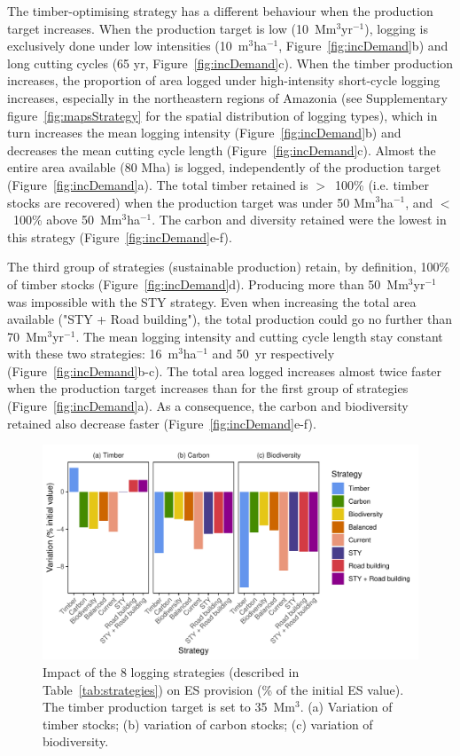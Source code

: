 \documentclass{article}
\begin{document}
The timber-optimising strategy has a different behaviour when the production target increases. When the production target is low (10~Mm$^3$yr$^{-1}$), logging is exclusively done under low intensities (10~m$^3$ha$^{-1}$, Figure~\ref{fig:incDemand}b) and long cutting cycles (65 yr, Figure~\ref{fig:incDemand}c). When the timber production increases, the proportion of area logged under high-intensity short-cycle logging increases, especially in the northeastern regions of Amazonia (see Supplementary figure~\ref{fig:mapsStrategy} for the spatial distribution of logging types), which in turn increases the mean logging intensity (Figure~\ref{fig:incDemand}b) and decreases the mean cutting cycle length (Figure~\ref{fig:incDemand}c). Almost the entire area available (80 Mha) is logged, independently of the production target (Figure~\ref{fig:incDemand}a). The total timber retained is $>$~100\% (i.e. timber stocks are recovered) when the production target was under 50 Mm$^3$ha$^{-1}$, and $<$~100\% above 50~Mm$^3$ha$^{-1}$. The carbon and diversity retained were the lowest in this strategy (Figure~\ref{fig:incDemand}e-f).  

The third group of strategies (sustainable production) retain, by definition, 100\% of timber stocks (Figure~\ref{fig:incDemand}d). Producing more than 50~Mm$^3$yr$^{-1}$ was impossible with the STY strategy. Even when increasing the total area available ("STY + Road building"), the total production could go no further than 70~Mm$^3$yr$^{-1}$. 
The mean logging intensity and cutting cycle length stay constant with these two strategies: 16~m$^3$ha$^{-1}$ and 50~yr respectively (Figure~\ref{fig:incDemand}b-c). The total area logged increases almost twice faster when the production target increases than for the first group of strategies (Figure~\ref{fig:incDemand}a). As a consequence, the carbon and biodiversity retained also decrease faster (Figure~\ref{fig:incDemand}e-f). 

\begin{figure}
    \centering
    \includegraphics[width=\linewidth]{graphs/costsScenario}
    \caption{Impact of the 8 logging strategies (described in Table~\ref{tab:strategies}) on ES provision (\% of the initial ES value). The timber production target is set to 35~Mm$^3$. (a) Variation of timber stocks; (b) variation of carbon stocks; (c) variation of biodiversity.}
    \label{fig:scenESProv}
\end{figure}
\end{document}
